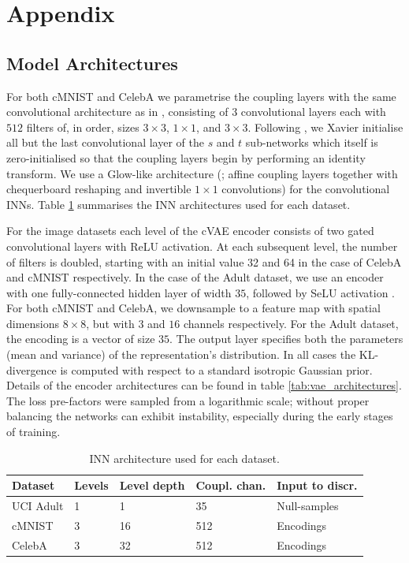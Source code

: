 \section{Appendix}\label{sec:nifr-appendix}
%
\subsection{Model Architectures}
%
\label{sec:architectures}
%
\noindent For both cMNIST and CelebA we parametrise the coupling layers with the same convolutional
architecture as in \citet{KinDha18}, consisting of $3$ convolutional layers each with $512$ filters
of, in order, sizes $3\times3$, $1\times1$, and $3\times3$. 
%
Following \citet{ardizzone2019guided}, we Xavier initialise all but the last convolutional layer of
the $s$ and $t$ sub-networks which itself is zero-initialised so that the coupling layers begin by
performing an identity transform. 
%
We use a Glow-like architecture (\citealp{KinDha18}; affine coupling layers together with
chequerboard reshaping and invertible $1\times1$ convolutions) for the convolutional INNs. 
%
Table \ref{tab:inn_architectures} summarises the INN architectures used for each dataset.

For the image datasets each level of the \ac{cVAE} encoder consists of two gated convolutional layers
\citep{van2016conditional} with ReLU activation. 
%
At each subsequent level, the number of filters is doubled, starting with an initial value 32 and
64 in the case of CelebA and cMNIST respectively. 
%
In the case of the Adult dataset, we use an encoder with one fully-connected hidden layer of width
$35$, followed by SeLU activation \citep{klambauer2017self}. 
%
For both cMNIST and CelebA, we downsample to a feature map with spatial dimensions $8\times8$, but
with $3$ and $16$ channels respectively. 
%
For the Adult dataset, the encoding is a vector of size $35$. 
%
The output layer specifies both the parameters (mean and variance) of the representation's
distribution. 
%
In all cases the KL-divergence is computed with respect to a standard isotropic Gaussian prior. 
%
Details of the encoder architectures can be found in table \ref{tab:vae_architectures}. 
%
The loss pre-factors were sampled from a logarithmic scale; without proper balancing the networks
can exhibit instability, especially during the early stages of training.

\begin{table}[tp]
\caption{INN architecture used for each dataset.}
\label{tab:inn_architectures}
\centering
\begin{tabular}{lllll}
\toprule
Dataset & Levels & Level depth & Coupl. chan. & Input to discr. \\ \midrule
UCI Adult                   & 1      & 1     & 35       & Null-samples       \\
cMNIST                      & 3      & 16     & 512      & Encodings               \\
CelebA                      & 3      & 32     & 512      & Encodings        \\ \bottomrule
\end{tabular}
\end{table}


